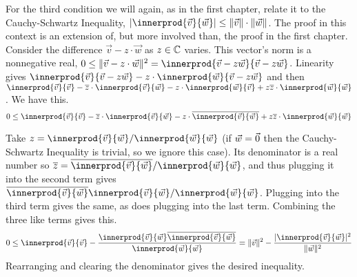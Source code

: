 For the third condition we will again, as in the first
chapter, relate it to the Cauchy-Schwartz Inequality,
$\absval{\innerprod{\vec{v}}{\vec{w}}}\leq \norm{\vec{v}}\cdot\norm{\vec{w}}$.
The proof in this context is an extension of, but more involved than, the 
proof in the first chapter. 
Consider the difference $\vec{v}-z\cdot\vec{w}$ as $z\in\mathbb{C}$ varies.
This vector's norm is a nonnegative real,
$0\leq \norm{\vec{v}-z\cdot\vec{w}}^2
   =\innerprod{\vec{v}-z\vec{w}}{\vec{v}-z\vec{w}}$.
Linearity gives
$\innerprod{\vec{v}}{\vec{v}-z\vec{w}}
  -z\cdot\innerprod{\vec{w}}{\vec{v}-z\vec{w}}$
and then
$\innerprod{\vec{v}}{\vec{v}}
  -\compconj{z}\cdot\innerprod{\vec{v}}{\vec{w}}
  -z\cdot\innerprod{\vec{w}}{\vec{v}}
  +z\compconj{z}\cdot\innerprod{\vec{w}}{\vec{w}}$.
We have this.
\begin{equation*}
 0
  \leq\innerprod{\vec{v}}{\vec{v}}
  -\compconj{z}\cdot\innerprod{\vec{v}}{\vec{w}}
  -z\cdot\compconj{\innerprod{\vec{v}}{\vec{w}}}
  +z\compconj{z}\cdot\innerprod{\vec{w}}{\vec{w}}
\end{equation*}

Take 
$z=\innerprod{\vec{v}}{\vec{w}}/\innerprod{\vec{w}}{\vec{w}}$
(if $\vec{w}=\vec{0}$ then the Cauchy-Schwartz Inequality is trivial, so we
ignore this case).
Its denominator is a real number so
$\compconj{z}=\compconj{\innerprod{\vec{v}}{\vec{w}}}/\innerprod{\vec{w}}{\vec{w}}$,
and thus plugging it into the second term gives 
$\compconj{\innerprod{\vec{v}}{\vec{w}}}\innerprod{\vec{v}}{\vec{w}}/\innerprod{\vec{w}}{\vec{w}}$.
Plugging into the third term gives the same,
as does plugging into the last term.
Combining the three like terms gives this.
\begin{equation*}
 0
  \leq\innerprod{\vec{v}}{\vec{v}}
  -\frac{\innerprod{\vec{v}}{\vec{w}}\compconj{\innerprod{\vec{v}}{\vec{w}}}}{\innerprod{\vec{w}}{\vec{w}}}
  =\norm{\vec{v}}^2
  -\frac{\absval{\innerprod{\vec{v}}{\vec{w}}}^2}{\norm{\vec{w}}^2}
\end{equation*}
Rearranging and clearing the denominator gives the desired 
inequality.

